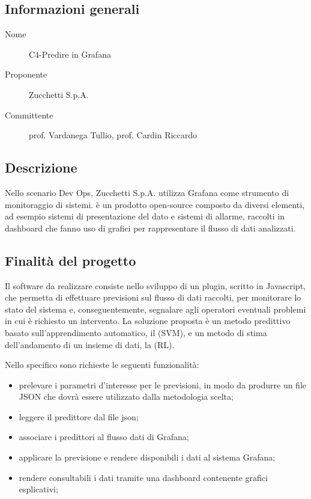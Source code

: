 \documentclass[../studio-di-fattibilita.tex]{subfiles}
\begin{document}
  \subsection{Informazioni generali}%
  \label{subsec:informazioni_generali}
  \begin{description}
    \item[Nome] C4-Predire in Grafana
    \item[Proponente] Zucchetti S.p.A.
    \item[Committente] prof. Vardanega Tullio, prof. Cardin Riccardo
  \end{description}


  \subsection{Descrizione}%
  \label{subsec:descrizione}
  Nello scenario Dev Ops, Zucchetti S.p.A. utilizza Grafana come strumento di monitoraggio di sistemi.
   è un prodotto open-source composto da diversi elementi, ad esempio sistemi di presentazione del dato e sistemi di allarme, raccolti in dashboard che fanno uso di grafici per rappresentare il flusso di dati analizzati.


  \subsection{Finalità del progetto}%
  \label{subsec:finalita_del_progetto}
  Il software da realizzare consiste nello sviluppo di un plugin, scritto in Javascript, che permetta di effettuare previsioni sul flusso di dati raccolti, per monitorare lo stato del sistema e, conseguentemente, segnalare agli operatori eventuali problemi in cui è richiesto un intervento. La soluzione proposta è un metodo predittivo basato sull'apprendimento automatico, il  (SVM), e un metodo di stima dell'andamento di un insieme di dati, la  (RL).

  Nello specifico sono richieste le seguenti funzionalità:
  \begin{itemize}
    \item prelevare i parametri d'interesse per le previsioni, in modo da produrre un file JSON che dovrà essere utilizzato dalla metodologia scelta;
    \item leggere il predittore dal file json;
    \item associare i predittori al flusso dati di Grafana;
    \item applicare la previsione e rendere disponibili i dati al sistema Grafana;
    \item rendere consultabili i dati tramite una dashboard contenente grafici esplicativi;
  \end{itemize}
\end{document}

